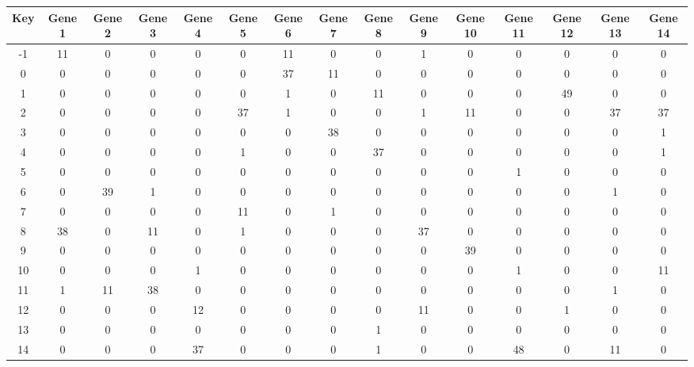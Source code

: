 \begin{tabular}{|c|c|c|c|c|c|c|c|c|c|c|c|c|c|c|}
\hline
Key & Gene 1 & Gene 2 & Gene 3 & Gene 4 & Gene 5 & Gene 6 & Gene 7 & Gene 8 & Gene 9 & Gene 10 & Gene 11 & Gene 12 & Gene 13 & Gene 14 \\
\hline
-1 & 11 & 0 & 0 & 0 & 0 & 11 & 0 & 0 & 1 & 0 & 0 & 0 & 0 & 0 \\
0 & 0 & 0 & 0 & 0 & 0 & 37 & 11 & 0 & 0 & 0 & 0 & 0 & 0 & 0 \\
1 & 0 & 0 & 0 & 0 & 0 & 1 & 0 & 11 & 0 & 0 & 0 & 49 & 0 & 0 \\
2 & 0 & 0 & 0 & 0 & 37 & 1 & 0 & 0 & 1 & 11 & 0 & 0 & 37 & 37 \\
3 & 0 & 0 & 0 & 0 & 0 & 0 & 38 & 0 & 0 & 0 & 0 & 0 & 0 & 1 \\
4 & 0 & 0 & 0 & 0 & 1 & 0 & 0 & 37 & 0 & 0 & 0 & 0 & 0 & 1 \\
5 & 0 & 0 & 0 & 0 & 0 & 0 & 0 & 0 & 0 & 0 & 1 & 0 & 0 & 0 \\
6 & 0 & 39 & 1 & 0 & 0 & 0 & 0 & 0 & 0 & 0 & 0 & 0 & 1 & 0 \\
7 & 0 & 0 & 0 & 0 & 11 & 0 & 1 & 0 & 0 & 0 & 0 & 0 & 0 & 0 \\
8 & 38 & 0 & 11 & 0 & 1 & 0 & 0 & 0 & 37 & 0 & 0 & 0 & 0 & 0 \\
9 & 0 & 0 & 0 & 0 & 0 & 0 & 0 & 0 & 0 & 39 & 0 & 0 & 0 & 0 \\
10 & 0 & 0 & 0 & 1 & 0 & 0 & 0 & 0 & 0 & 0 & 1 & 0 & 0 & 11 \\
11 & 1 & 11 & 38 & 0 & 0 & 0 & 0 & 0 & 0 & 0 & 0 & 0 & 1 & 0 \\
12 & 0 & 0 & 0 & 12 & 0 & 0 & 0 & 0 & 11 & 0 & 0 & 1 & 0 & 0 \\
13 & 0 & 0 & 0 & 0 & 0 & 0 & 0 & 1 & 0 & 0 & 0 & 0 & 0 & 0 \\
14 & 0 & 0 & 0 & 37 & 0 & 0 & 0 & 1 & 0 & 0 & 48 & 0 & 11 & 0 \\
\hline
\end{tabular}